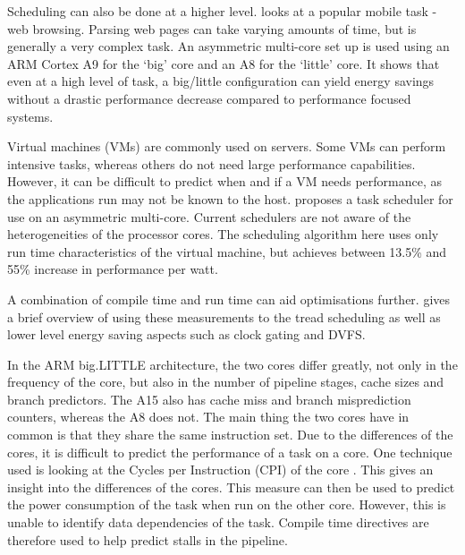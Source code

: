 Scheduling can also be done at a higher level. 
\cite{zhu2013high} looks at a popular mobile task - web browsing. 
Parsing web pages can take varying amounts of time, but is generally a very complex task. 
An asymmetric multi-core set up is used using an ARM Cortex A9 for the `big' core and an A8 for the `little' core. 
It shows that even at a high level of task, a big/little configuration can yield energy savings without a drastic performance decrease compared to performance focused systems.

Virtual machines (VMs) are commonly used on servers. 
Some VMs can perform intensive tasks, whereas others do not need large performance capabilities.
However, it can be difficult to predict when and if a VM needs performance, as the applications run may not be known to the host. 
\cite{wang2012energy} proposes a task scheduler for use on an asymmetric multi-core. 
Current schedulers are not aware of the heterogeneities of the processor cores. 
The scheduling algorithm here uses only run time characteristics of the virtual machine, but achieves between 13.5\% and 55\% increase in performance per watt.

A combination of compile time and run time can aid optimisations further. 
\cite{de2012power} gives a brief overview of using these measurements to the tread scheduling as well as lower level energy saving aspects such as clock gating and DVFS. 


In the ARM big.LITTLE architecture, the two cores differ greatly, not only in the frequency of the core, but also in the number of pipeline stages, cache sizes and branch predictors.
The A15 also has cache miss and branch misprediction counters, whereas the A8 does not. 
The main thing the two cores have in common is that they share the same instruction set. 
Due to the differences of the cores, it is difficult to predict the performance of a task on a core.
One technique used is looking at the Cycles per Instruction (CPI) of the core \cite{pricopi2013power}. 
This gives an insight into the differences of the cores. 
This measure can then be used to predict the power consumption of the task when run on the other core. 
However, this is unable to identify data dependencies of the task. 
Compile time directives are therefore used to help predict stalls in the pipeline. 


